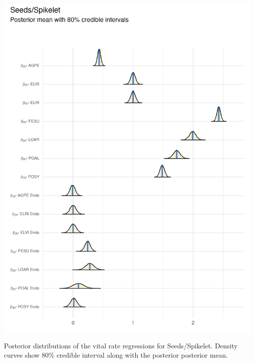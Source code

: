 \documentclass[lineno, sn-basic]{sn-jnl}%
\begin{document}
\begin{myfigure}[H]
	\centering
	\includegraphics[width = .8\linewidth]{seedmean_posteriors_plot.png}
	\caption[Posterior distributions of the vital rate regressions for Seeds/Spikelet]{Posterior distributions of the vital rate regressions for Seeds/Spikelet. Density curves show $80\%$ credible interval along with the posterior posterior mean.}
\end{myfigure}
\end{document}
